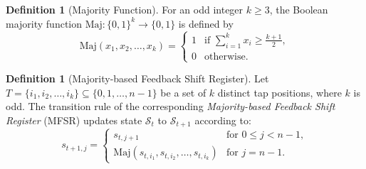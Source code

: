 \documentclass[11pt,reqno]{amsart}
\theoremstyle{definition}
\newtheorem{definition}[theorem]{Definition}
\newcommand{\Maj}{\mathrm{Maj}}
\begin{document}
\begin{definition}[Majority Function]
For an odd integer $k \ge 3$, the Boolean majority 
function $\Maj \colon \{0, 1\}^k \to \{0, 1\}$ is defined by
\[
\Maj(x_1, x_2, \dots, x_k) = 
\begin{cases} 
1 & \text{if } \sum_{i=1}^k x_i \ge \frac{k+1}{2}, \\
0 & \text{otherwise.}
\end{cases}
\]
\end{definition}

\begin{definition}[Majority-based Feedback Shift Register]
Let $T = \{i_1, i_2, \dots, i_k\} \subseteq \{0, 1, \dots, n-1\}$ 
be a set of $k$ distinct tap positions, where $k$ is odd. 
The transition rule of the corresponding 
{\em Majority-based Feedback Shift Register} (MFSR) updates 
state $\mathcal{S}_t$ to $\mathcal{S}_{t+1}$ according to:
\[
s_{t+1, j} = 
\begin{cases}
s_{t, j+1} & \text{for } 0 \le j < n-1, \\
\Maj(s_{t, i_1}, s_{t, i_2}, \dots, s_{t, i_k}) & \text{for } j = n-1.
\end{cases}
\]
\end{definition}
\end{document}
